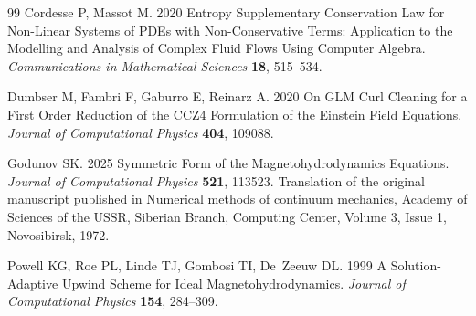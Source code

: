 \documentclass{myclass}
\begin{document}
\begin{thebibliography}{99}
Cordesse P, Massot M. 2020  Entropy Supplementary Conservation Law for
  Non-Linear Systems of {{PDEs}} with Non-Conservative Terms: Application to
  the Modelling and Analysis of Complex Fluid Flows Using Computer Algebra.
  {\em Communications in Mathematical Sciences} \textbf{18}, 515--534.

Dumbser M, Fambri F, Gaburro E, Reinarz A. 2020  On {{GLM}} Curl Cleaning for a
  First Order Reduction of the {{CCZ4}} Formulation of the {{Einstein}} Field
  Equations. {\em Journal of Computational Physics} \textbf{404}, 109088.

Godunov SK. 2025  Symmetric Form of the Magnetohydrodynamics Equations. {\em
  Journal of Computational Physics} \textbf{521}, 113523.
Translation of the original manuscript published in Numerical methods of
  continuum mechanics, Academy of Sciences of the USSR, Siberian Branch,
  Computing Center, Volume 3, Issue 1, Novosibirsk, 1972.

Powell KG, Roe PL, Linde TJ, Gombosi TI, De~Zeeuw DL. 1999  A
  {{Solution-Adaptive Upwind Scheme}} for {{Ideal Magnetohydrodynamics}}. {\em
  Journal of Computational Physics} \textbf{154}, 284--309.

\end{thebibliography}
 
 
\end{document}
